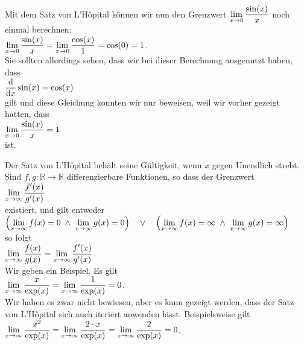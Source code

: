 \example
Mit dem Satz von L'H\^opital k\"onnen wir nun den Grenzwert
$\displaystyle\lim\limits_{x \rightarrow 0} \frac{\sin(x)}{x}$ noch einmal berechnen: 
\\[0.1cm]
\hspace*{1.3cm} $\displaystyle\lim\limits_{x \rightarrow 0} \frac{\sin(x)}{x} = \lim\limits_{x \rightarrow 0}
\frac{\cos(x)}{1} = \cos(0) = 1$.
\\[0.2cm]
Sie sollten allerdings sehen, dass wir bei dieser Berechnung ausgenutzt haben, dass
\\[0.2cm]
\hspace*{1.3cm}
$\displaystyle\frac{\textrm{d}}{\textrm{d}x}\sin(x) = \cos(x)$
\\[0.2cm]
gilt und diese Gleichung konnten wir nur beweisen, weil wir vorher gezeigt hatten, dass
\\[0.2cm]
\hspace*{1.3cm}
$\displaystyle\lim\limits_{x \rightarrow 0} \frac{\sin(x)}{x} = 1$
\\[0.2cm]
ist.
\eox

\remark
Der Satz von L'H\^opital beh\"alt seine G\"ultigkeit, wenn $x$ gegen Unendlich strebt.  Sind 
$f,g:\mathbb{R} \rightarrow \mathbb{R}$ differenzierbare Funktionen, so dass der Grenzwert
\\[0.3cm]
\hspace*{1.3cm}
$\displaystyle\lim\limits_{x \rightarrow \infty} \frac{f'(x)}{g'(x)}$ 
\\[0.3cm]
existiert, und gilt entweder 
\\[0.3cm]
\hspace*{0.3cm}
$\Bigl(\lim\limits_{x \rightarrow \infty} f(x) = 0 \;\wedge\; \lim\limits_{x \rightarrow \infty} g(x) = 0\Bigr) \quad \vee \quad
 \Bigl(\lim\limits_{x \rightarrow \infty} f(x) = \infty \;\wedge\;\lim\limits_{x \rightarrow \infty} g(x) = \infty\Bigr)$ 
\\[0.3cm]
so folgt
\\
\hspace*{1.3cm}
$\displaystyle\lim\limits_{x \rightarrow \infty} \frac{f(x)}{g(x)} = \lim\limits_{x \rightarrow \infty} \frac{f'(x)}{g'(x)}$.
\\[0.3cm]
Wir geben ein Beispiel.  Es gilt 
\\[0.3cm]
\hspace*{1.3cm}
$\displaystyle\lim\limits_{x \rightarrow \infty} \frac{x}{\exp(x)} = \lim\limits_{x \rightarrow \infty} \frac{1}{\exp(x)} = 0$.
\\[0.3cm]
Wir haben es zwar nicht bewiesen, aber es kann gezeigt werden, dass der Satz von L'H\^opital  sich
auch iteriert anwenden l\"asst.  Beispielsweise gilt
\\[0.3cm]
\hspace*{1.3cm}
$\displaystyle\lim\limits_{x \rightarrow \infty} \frac{x^2}{\exp(x)} = \lim\limits_{x \rightarrow \infty}
\frac{2\cdot x}{\exp(x)} =\lim\limits_{x \rightarrow \infty} \frac{2}{\exp(x)} = 0$. \eox


